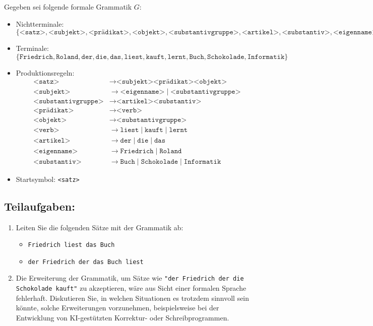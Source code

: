 \documentclass[a4paper,12pt]{article}
\begin{document}
Gegeben sei folgende formale Grammatik \( G \):

\begin{itemize}
	\item Nichtterminale: \( \{ \texttt{<satz>}, \texttt{<subjekt>}, \texttt{<prädikat>}, \texttt{<objekt>}, \texttt{<substantivgruppe>}, \texttt{<artikel>}, \texttt{<substantiv>}, \texttt{<eigenname>}, \texttt{<verb>} \} \)
	\item Terminale: \( \{ \texttt{Friedrich}, \texttt{Roland}, \texttt{der}, \texttt{die}, \texttt{das}, \texttt{liest}, \texttt{kauft}, \texttt{lernt}, \texttt{Buch}, \texttt{Schokolade}, \texttt{Informatik} \} \)
	\item Produktionsregeln:
	\[
	\begin{aligned}
		\texttt{<satz>} &\rightarrow \texttt{<subjekt><prädikat><objekt>} \\
		\texttt{<subjekt>} &\rightarrow \texttt{<eigenname>} \mid \texttt{<substantivgruppe>} \\
		\texttt{<substantivgruppe>} &\rightarrow \texttt{<artikel><substantiv>} \\
		\texttt{<prädikat>} &\rightarrow \texttt{<verb>} \\
		\texttt{<objekt>} &\rightarrow \texttt{<substantivgruppe>} \\
		\texttt{<verb>} &\rightarrow \texttt{liest} \mid \texttt{kauft} \mid \texttt{lernt} \\
		\texttt{<artikel>} &\rightarrow \texttt{der} \mid \texttt{die} \mid \texttt{das} \\
		\texttt{<eigenname>} &\rightarrow \texttt{Friedrich} \mid \texttt{Roland} \\
		\texttt{<substantiv>} &\rightarrow \texttt{Buch} \mid \texttt{Schokolade} \mid \texttt{Informatik}
	\end{aligned}
	\]
	\item Startsymbol: \texttt{<satz>}
\end{itemize}

\subsection*{Teilaufgaben:}

\begin{enumerate}
	\item Leiten Sie die folgenden Sätze mit der Grammatik ab:
	\begin{itemize}
		\item \texttt{Friedrich liest das Buch}
		\item \texttt{der Friedrich der das Buch liest}
	\end{itemize}
	
	\item Die Erweiterung der Grammatik, um Sätze wie \texttt{"der Friedrich der die Schokolade kauft"} zu akzeptieren, wäre aus Sicht einer formalen Sprache fehlerhaft.  
	Diskutieren Sie, in welchen Situationen es trotzdem sinnvoll sein könnte, solche Erweiterungen vorzunehmen, beispielsweise bei der Entwicklung von KI-gestützten Korrektur- oder Schreibprogrammen.
\end{enumerate}
	
\end{document}
